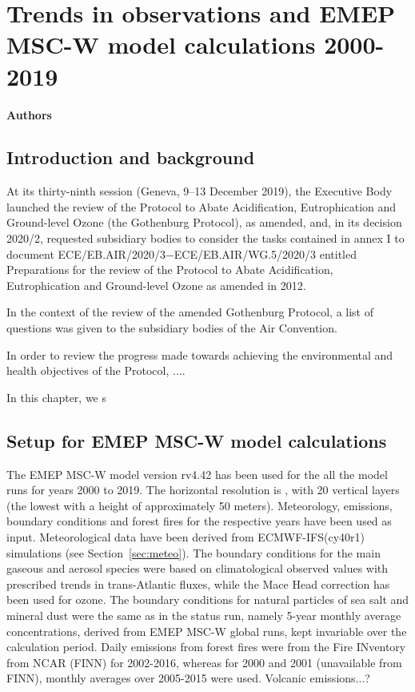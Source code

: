 \chapter[Trends]{Trends in observations and EMEP MSC-W model calculations 2000-2019}
\label{ch:Trends}

{\bf{Authors}}\\


\section{\label{sec:Trends_introduction}Introduction and background}
At its thirty-ninth session (Geneva, 9–13 December 2019), the Executive Body launched the review of the Protocol to Abate Acidification, Eutrophication and Ground-level Ozone (the Gothenburg Protocol), as amended, and, in its decision 2020/2, requested subsidiary bodies to consider the tasks contained in annex I to document ECE/EB.AIR/2020/3−ECE/EB.AIR/WG.5/2020/3 entitled Preparations for the review of the Protocol to Abate Acidification, Eutrophication and Ground-level Ozone as amended in 2012.

In the context of the review of the amended Gothenburg Protocol, a list of questions was given to the subsidiary bodies of the Air Convention.

In order to review the progress made towards achieving the environmental and health objectives of the Protocol, ....

In this chapter, we s


\section{\label{EMEPmodelcalc}{Setup for EMEP MSC-W model calculations}}
The EMEP MSC-W model version rv4.42 has been used for the all the model runs for years 2000 to 2019. The horizontal resolution is \resZO, with 20 vertical layers (the lowest with a height of approximately 50 meters).
 Meteorology, emissions, boundary conditions and forest fires for the respective years have been used as input. Meteorological data have been
 derived from ECMWF-IFS(cy40r1) simulations (see Section~\ref{sec:meteo}). 
 The boundary conditions for the main gaseous and aerosol species were based on climatological observed values with prescribed trends in trans-Atlantic fluxes, while the Mace
Head correction has been used for ozone. The boundary conditions for natural particles of
sea salt and mineral dust were the same as in the status run, namely 5-year monthly average
concentrations, derived from EMEP MSC-W global runs, kept invariable over the calculation
period.
Daily emissions from forest fires were from the Fire INventory from NCAR (FINN) for 2002-2016,
whereas for 2000 and 2001 (unavailable from FINN), monthly averages over 2005-2015 were
used.
 Volcanic emissions...?
 
